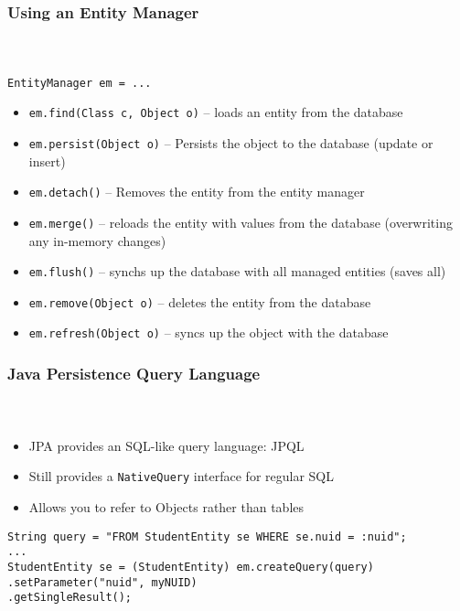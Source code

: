 \documentclass{beamer}
\begin{document}
\begin{frame}[fragile]
  \frametitle{Using an Entity Manager}
  \framesubtitle{~}

\lstinline|EntityManager em = ...|
\begin{itemize}
  \item \lstinline|em.find(Class c, Object o)| -- loads an entity from the database
  \item \lstinline|em.persist(Object o)| -- Persists the object to the database (update or insert)
  \item \lstinline|em.detach()| -- Removes the entity from the entity manager
  \item \lstinline|em.merge()| -- reloads the entity with values from the database (overwriting any in-memory changes)
  \item \lstinline|em.flush()| -- synchs up the database with all managed entities (saves all)
  \item \lstinline|em.remove(Object o)| -- deletes the entity from the database
  \item \lstinline|em.refresh(Object o)| -- syncs up the object with the database
\end{itemize}

\end{frame}

\begin{frame}[fragile]
  \frametitle{Java Persistence Query Language}
  \framesubtitle{~}

\begin{itemize}
  \item JPA provides an SQL-like query language: JPQL
  \item Still provides a \lstinline|NativeQuery| interface for regular SQL
  \item Allows you to refer to Objects rather than tables
\end{itemize}

\begin{lstlisting}
String query = "FROM StudentEntity se WHERE se.nuid = :nuid";
...
StudentEntity se = (StudentEntity) em.createQuery(query)
.setParameter("nuid", myNUID)
.getSingleResult();
\end{lstlisting}

\end{frame}
\end{document}
